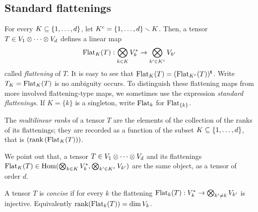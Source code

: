 \subsection{Standard flattenings}
\label{preliminaries-subsection-flattenings}
\begin{definition}
\label{introduction-definition-flattenings}
For every $K \subseteq \{1 , \ldots , d\}$, let $K^c = \{1, \ldots , d\} \smallsetminus K$. Then, a tensor $T \in V_1 \otimes \cdots \otimes V_d$ defines a linear map 
\[
    \mathrm{Flat}_K(T): \bigotimes_{k \in K} V_{k}^* \to  \bigotimes_{k' \in K^c} V_{k'}
\]
called \emph{flattening} of $T$. It is easy to see that $\mathrm{Flat}_K(T) = (\mathrm{Flat}_{K^c}(T))^{\mathbf{t}}$. Write $T_K = \mathrm{Flat}_{K}(T)$ is no ambiguity occurs. To distinguish these flattening maps from more involved flattening-type maps, we sometimes use the expression \emph{standard flattenings}. If $K = \{k\}$ is a singleton, write $\mathrm{Flat}_k$ for $\mathrm{Flat}_{\{k\}}$.

The {\it multilinear ranks} of a tensor $T$ are the elements of the collection of the ranks of its flattenings; they are recorded as a function of the subset $K \subseteq \{ 1 , \ldots , d\}$, that is $(\mathrm{rank} \left( \mathrm{Flat}_K(T) \right))$. 
\end{definition}
We point out that, a tensor $T \in V_1 \otimes \cdots \otimes V_d$ and its flattenings $\mathrm{Flat}_K(T) \in \operatorname{Hom} ( \bigotimes_{k \in K} V_{k}^*,\bigotimes_{k' \in K^c} V_{k'})$ are the same object, as a tensor of order $d$. 

\begin{definition}
\label{introduction-definition-concise}
A tensor $T$ is \emph{concise} if for every $k$ the flattening $\mathrm{Flat}_k(T) : V_k^* \to \bigotimes_{k' \neq k} V_{k'}$ is injective. Equivalently $\mathrm{rank}(\mathrm{Flat}_k(T)) = \dim V_k$.
\end{definition}


